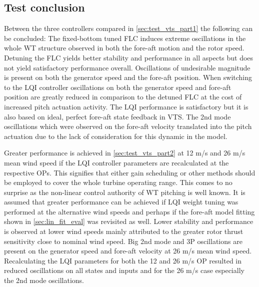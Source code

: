 \subsection{Test conclusion}
Between the three controllers compared in \cref{sec:test_vts_part1} the following can be concluded: The fixed-bottom tuned FLC induces extreme oscillations in the whole WT structure observed in both the fore-aft motion and the rotor speed. Detuning the FLC yields better stability and performance in all aspects but does not yield satisfactory performance overall. Oscillations of undesirable magnitude is present on both the generator speed and the fore-aft position. When switching to the LQI controller oscillations on both the generator speed and fore-aft position are greatly reduced in comparison to the detuned FLC at the cost of increased pitch actuation activity. The LQI performance is satisfactory but it is also based on ideal, perfect fore-aft state feedback in VTS. The 2nd mode oscillations which were observed on the fore-aft velocity translated into the pitch actuation due to the lack of consideration for this dynamic in the model.

Greater performance is achieved in \cref{sec:test_vts_part2} at 12 m/s and 26 m/s mean wind speed if the LQI controller parameters are recalculated at the respective OPs. This signifies that either gain scheduling or other methods should be employed to cover the whole turbine operating range. This comes to no surprise as the non-linear control authority of WT pitching is well known. It is assumed that greater performance can be achieved if LQI weight tuning was performed at the alternative wind speeds and perhaps if the fore-aft model fitting shown in \cref{sec:lin_fit_eval} was revisited as well. Lower stability and performance is observed at lower wind speeds mainly attributed to the greater rotor thrust sensitivity close to nominal wind speed. Big 2nd mode and 3P oscillations are present on the generator speed and fore-aft velocity at 26 m/s mean wind speed. Recalculating the LQI parameters for both the 12 and 26 m/s OP resulted in reduced oscillations on all states and inputs and for the 26 m/s case especially the 2nd mode oscillations.